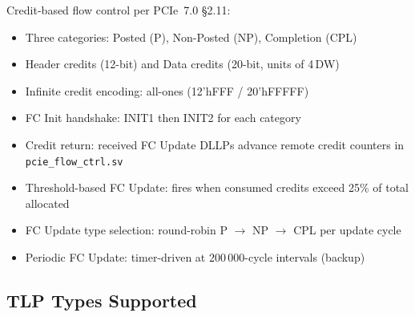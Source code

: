 \documentclass[11pt,a4paper]{article}
\begin{document}
Credit-based flow control per PCIe~7.0 \S2.11:
\begin{itemize}[noitemsep]
  \item Three categories: Posted (P), Non-Posted (NP), Completion (CPL)
  \item Header credits (12-bit) and Data credits (20-bit, units of 4\,DW)
  \item Infinite credit encoding: all-ones (12'hFFF / 20'hFFFFF)
  \item FC Init handshake: INIT1 then INIT2 for each category
  \item Credit return: received FC Update DLLPs advance remote credit counters in \texttt{pcie\_flow\_ctrl.sv}
  \item Threshold-based FC Update: fires when consumed credits exceed 25\% of total allocated
  \item FC Update type selection: round-robin P $\to$ NP $\to$ CPL per update cycle
  \item Periodic FC Update: timer-driven at 200\,000-cycle intervals (backup)
\end{itemize}

\subsection{TLP Types Supported}
\end{document}
